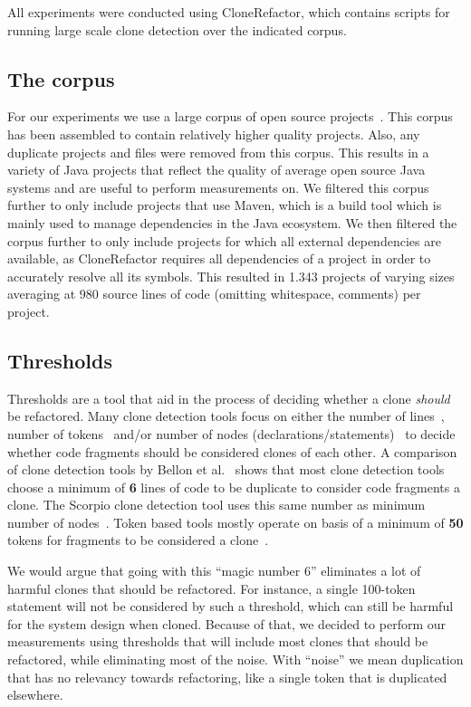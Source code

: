 \documentclass[a4paper]{article}
\begin{document}
All experiments were conducted using CloneRefactor, which contains scripts for running large scale clone detection over the indicated corpus.

\subsection{The corpus}\label{chap:corpus}
For our experiments we use a large corpus of open source projects~\cite{githubCorpus2013}. This corpus has been assembled to contain relatively higher quality projects. Also, any duplicate projects and files were removed from this corpus. This results in a variety of Java projects that reflect the quality of average open source Java systems and are useful to perform measurements on. We filtered this corpus further to only include projects that use Maven, which is a build tool which is mainly used to manage dependencies in the Java ecosystem. We then filtered the corpus further to only include projects for which all external dependencies are available, as CloneRefactor requires all dependencies of a project in order to accurately resolve all its symbols. This resulted in 1.343 projects of varying sizes averaging at 980 source lines of code (omitting whitespace, comments) per project.

\subsection{Thresholds}\label{chap:thresholds}
Thresholds are a tool that aid in the process of deciding whether a clone \textit{should} be refactored. Many clone detection tools focus on either the number of lines~\cite{kamiya2002ccfinder, svajlenko2016bigcloneeval}, number of tokens~\cite{roy2008nicad, sajnani2016sourcerercc, ragkhitwetsagul2019siamese} and/or number of nodes (declarations/statements)~\cite{higo2013revisiting} to decide whether code fragments should be considered clones of each other. A comparison of clone detection tools by Bellon et al.~\cite{bellon2007comparison} shows that most clone detection tools choose a minimum of \textbf{6} lines of code to be duplicate to consider code fragments a clone. The Scorpio clone detection tool uses this same number as minimum number of nodes~\cite{higo2013revisiting}. Token based tools mostly operate on basis of a minimum of \textbf{50} tokens for fragments to be considered a clone~\cite{sajnani2016sourcerercc}.

We would argue that going with this ``magic number 6'' eliminates a lot of harmful clones that should be refactored. For instance, a single 100-token statement will not be considered by such a threshold, which can still be harmful for the system design when cloned. Because of that, we decided to perform our measurements using thresholds that will include most clones that should be refactored, while eliminating most of the noise. With ``noise'' we mean duplication that has no relevancy towards refactoring, like a single token that is duplicated elsewhere.
\end{document}
